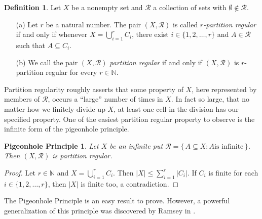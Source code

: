 \documentclass[12pt]{article}
\theoremstyle{plain}
\newtheorem*{php}{Pigeonhole Principle}
\theoremstyle{definition}
\newtheorem{defn}[thm]{Definition}
\newcommand{\bbN}{\mathbb{N}}
\newcommand{\calR}{\mathcal{R}}
\begin{document}
\begin{defn}
  Let $X$ be a nonempty set and $\calR$ a collection of sets with
  $\emptyset\not\in \calR$. 
  \begin{itemize}
    \item[(a)] Let $r$ be a natural number. 
      The pair $(X, \calR)$ is called \textsl{\mbox{$r$-partition}
        regular} if and only if whenever $X = \bigcup_{i=1}^r
      C_i$, there exist $i \in \{1, 2, \ldots, r\}$ and $A \in \calR$
      such that $A \subseteq C_i$.

    \item[(b)] We call the pair $(X, \calR)$ \textsl{partition
        regular} if and only if $(X, \calR)$ is \mbox{$r$-partition}
      regular for every $r \in \bbN$.
  \end{itemize}
\end{defn}


Partition regularity roughly asserts that some property of $X$, here
represented by members of $\calR$, occurs a ``large'' number of times
in $X$.
In fact so large, that no matter how we finitely divide up $X$, at
least one cell in the division has our specified property. 
One of the easiest partition regular property to observe is the
infinite form of the pigeonhole principle.

\begin{php}
  Let $X$ be an infinite put $\calR = \{\, A \subseteq X : \mbox{$A$
    is infinite} \,\}$.
  Then $(X, \calR)$ is partition regular.
\end{php}
\begin{proof}
  Let $r \in \bbN$ and $X = \bigcup_{i=1}^r C_i$.
  Then $|X| \le \sum_{i=1}^r |C_i|$.
  If $C_i$ is finite for each $i \in \{1, 2, \ldots, r\}$,
  then $|X|$ is finite too, a contradiction.
\end{proof}

The Pigeonhole Principle is an easy result to prove. 
However, a powerful generalization of this principle was discovered by
Ramsey in \cite[Theorem A]{Ramsey:1930uq}. 
\end{document}
